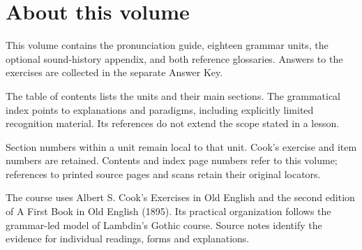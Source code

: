 \section*{About this volume}
This volume contains the pronunciation guide, eighteen grammar units, the optional sound-history appendix, and both reference glossaries. Answers to the exercises are collected in the separate Answer Key.\par
The table of contents lists the units and their main sections. The grammatical index points to explanations and paradigms, including explicitly limited recognition material. Its references do not extend the scope stated in a lesson.\par
Section numbers within a unit remain local to that unit. Cook’s exercise and item numbers are retained. Contents and index page numbers refer to this volume; references to printed source pages and scans retain their original locators.\par
The course uses Albert S. Cook’s Exercises in Old English and the second edition of A First Book in Old English (1895). Its practical organization follows the grammar-led model of Lambdin’s Gothic course. Source notes identify the evidence for individual readings, forms and explanations.\par
\clearpage\renewcommand{\runningtitle}{Contents}
\setcounter{tocdepth}{2}
\tableofcontents
\BookRecto{}






















\BookRecto\begingroup\renewcommand{\runningtitle}{Grammatical index}
\label{grammatical-index}
\fontsize{10.5}{13.2}\selectfont\setlength{\columnsep}{6mm}\raggedcolumns

\clearpage\endgroup

